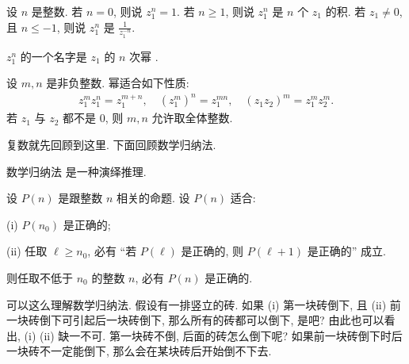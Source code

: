 \begin{definition}
    设 $n$ 是整数. 若 $n=0$, 则说 $z_1^n = 1$. 若 $n \geq 1$, 则说 $z_1^n$ 是 $n$ 个 $z_1$ 的积. 若 $z_1 \neq 0$, 且 $n \leq -1$, 则说 $z_1^n$ 是 $\frac{1}{z_1^{-n}}$.

    $z_1^n$ 的一个名字是 $z_1$ 的 $n$ 次幂 .
\end{definition}

\begin{proposition}
    设 $m,n$ 是非负整数. 幂适合如下性质:
    \begin{align*}
        z_1^m z_1^n = z_1^{m+n}, \quad (z_1^m)^n = z_1^{mn}, \quad (z_1 z_2)^m = z_1^m z_2^m.
    \end{align*}
    若 $z_1$ 与 $z_2$ 都不是 $0$, 则 $m,n$ 允许取全体整数.
\end{proposition}

复数就先回顾到这里. 下面回顾数学归纳法.

\begin{remark}
    数学归纳法  是一种演绎推理.
\end{remark}

\begin{proposition}
    设 $P(n)$ 是跟整数 $n$ 相关的命题. 设 $P(n)$ 适合:

    (i) $P(n_0)$ 是正确的;

    (ii) 任取 $\ell \geq n_0$, 必有 ``若 $P(\ell)$ 是正确的, 则 $P(\ell + 1)$ 是正确的'' 成立.

    则任取不低于 $n_0$ 的整数 $n$, 必有 $P(n)$ 是正确的.
\end{proposition}

\begin{remark}
    可以这么理解数学归纳法. 假设有一排竖立的砖. 如果 (i) 第一块砖倒下, 且 (ii) 前一块砖倒下可引起后一块砖倒下, 那么所有的砖都可以倒下, 是吧? 由此也可以看出, (i) (ii) 缺一不可. 第一块砖不倒, 后面的砖怎么倒下呢? 如果前一块砖倒下时后一块砖不一定能倒下, 那么会在某块砖后开始倒不下去.
\end{remark}

